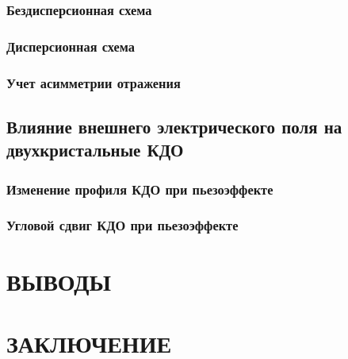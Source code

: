 \documentclass[pdftex,a4paper,14pt,english,russian]{extarticle}
\makeatletter
\numberwithin{equation}{subsection}
\def\redeflsection{\def\l@section{\@dottedtocline{1}{1.5em}{7.8em}}}
\renewcommand\appendix{\par
\setcounter{section}{0}%
\setcounter{subsection}{0}%
\def\@chapapp{\appendixname}%
\addtocontents{toc}{\protect\redeflsection}
\def\thesection{\appendixname\hspace{0.2cm}\@arabic\c@section}}
\makeatother
\begin{document}
    \subsubsection{Бездисперсионная схема}
    
    \subsubsection{Дисперсионная схема}
    
    \subsubsection{Учет асимметрии отражения}
    
  \subsection{Влияние внешнего электрического поля на двухкристальные КДО}
    \subsubsection{Изменение профиля КДО при пьезоэффекте}
      
    \subsubsection{Угловой сдвиг КДО при пьезоэффекте}
      
    \newpage

    \section*{ \centering ВЫВОДЫ }

      
      \newpage

      \section*{ \centering ЗАКЛЮЧЕНИЕ }
      

\newpage
  \begin{center}
  
  \end{center}

\newpage
\appendix
  
  
  
\end{document}
